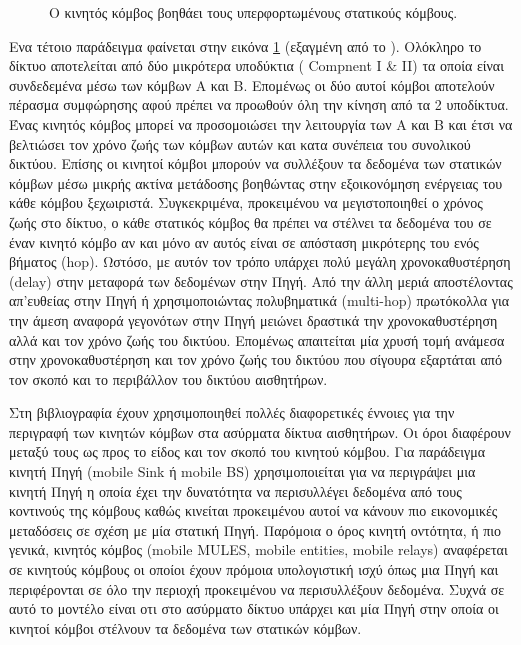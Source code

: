 \begin{itemize}
\begin{figure}[h]
	\caption{O κινητός κόμβος βοηθάει τους υπερφορτωμένους στατικούς κόμβους.}
	\label{fig:mobile_help}
\end{figure}
Ενα τέτοιο παράδειγμα φαίνεται στην εικόνα \ref{fig:mobile_help} (εξαγμένη από το \cite{using_mobile_elements_to_prolong_lefetime}). Ολόκληρο το δίκτυο αποτελείται
από δύο μικρότερα υποδύκτια ( Compnent I \& II) τα οποία είναι συνδεδεμένα μέσω των κόμβων Α και Β. Επομένως οι δύο αυτοί κόμβοι αποτελούν πέρασμα συμφώρησης αφού
πρέπει να προωθούν όλη την κίνηση από τα 2 υποδίκτυα. Ένας κινητός κόμβος μπορεί να προσομοιώσει την λειτουργία των Α και Β και έτσι να βελτιώσει τον χρόνο ζωής των
κόμβων αυτών και κατα συνέπεια του συνολικού δικτύου. Επίσης οι κινητοί κόμβοι μπορούν να συλλέξουν τα δεδομένα των στατικών κόμβων μέσω μικρής ακτίνα μετάδοσης
βοηθώντας στην εξοικονόμηση ενέργειας του κάθε κόμβου ξεχωιριστά. Συγκεκριμένα, προκειμένου να μεγιστοποιηθεί ο χρόνος ζωής στο δίκτυο, ο κάθε στατικός κόμβος θα
πρέπει να στέλνει τα δεδομένα του σε έναν κινητό κόμβο αν και μόνο αν αυτός είναι σε απόσταση μικρότερης του ενός βήματος (hop). Ωστόσο, με αυτόν τον τρόπο υπάρχει
πολύ μεγάλη χρονοκαθυστέρηση (delay) στην μεταφορά των δεδομένων στην Πηγή. Από την άλλη μεριά αποστέλοντας απ'ευθείας στην Πηγή ή χρησιμοποιώντας πολυβηματικά
(multi-hop) πρωτόκολλα για την άμεση αναφορά γεγονότων στην Πηγή μειώνει δραστικά την χρονοκαθυστέρηση αλλά και τον χρόνο ζωής του δικτύου. Επομένως απαιτείται μία
χρυσή τομή ανάμεσα στην χρονοκαθυστέρηση και τον χρόνο ζωής του δικτύου που σίγουρα εξαρτάται από τον σκοπό και το περιβάλλον του δικτύου αισθητήρων.
\end{itemize}

Στη βιβλιογραφία έχουν χρησιμοποιηθεί πολλές διαφορετικές έννοιες για την περιγραφή των κινητών κόμβων στα ασύρματα δίκτυα αισθητήρων. Οι όροι διαφέρουν μεταξύ τους
ως προς το είδος και τον σκοπό του κινητού κόμβου. Για παράδειγμα κινητή Πηγή (mobile Sink ή mobile BS) χρησιμοποιείται για να περιγράψει μια κινητή Πηγή η οποία
έχει την δυνατότητα να περισυλλέγει δεδομένα από τους κοντινούς της κόμβους καθώς κινείται προκειμένου αυτοί να κάνουν πιο εικονομικές μεταδόσεις σε σχέση με μία
στατική Πηγή. Παρόμοια ο όρος κινητή οντότητα, ή πιο γενικά, κινητός κόμβος (mobile MULES, mobile entities, mobile relays) αναφέρεται σε κινητούς κόμβους οι οποίοι
έχουν πρόμοια υπολογιστική ισχύ όπως μια Πηγή και περιφέρονται σε όλο την περιοχή προκειμένου να περισυλλέξουν δεδομένα. Συχνά σε αυτό το μοντέλο είναι οτι
στο ασύρματο δίκτυο υπάρχει και μία Πηγή στην οποία οι κινητοί κόμβοι στέλνουν τα δεδομένα των στατικών κόμβων.

